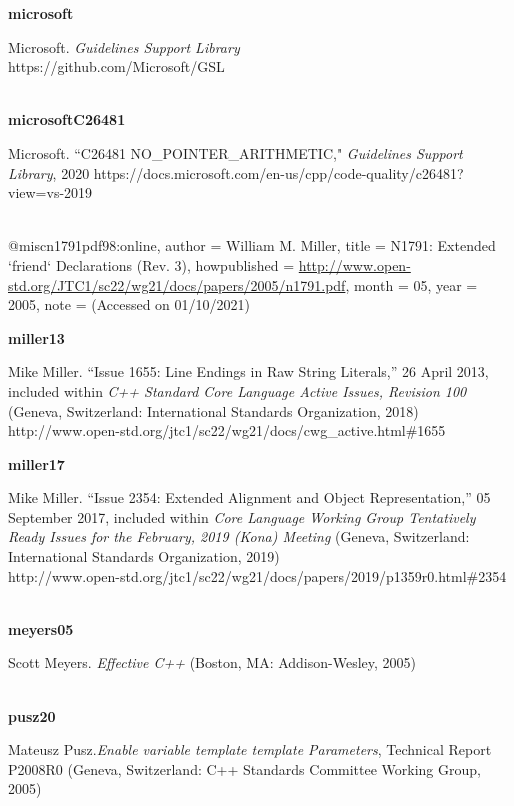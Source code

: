 \noindent\textbf{microsoft}\\
\hspace*{2em}\parbox[t]{\textwidth}{Microsoft. \textit{Guidelines Support Library}\\
https://github.com/Microsoft/GSL}\\

\noindent\textbf{microsoftC26481}\\
\hspace*{2em}\parbox[t]{\textwidth}{Microsoft. ``C26481 NO\_POINTER\_ARITHMETIC," \textit{Guidelines Support Library}, 2020
https://docs.microsoft.com/en-us/cpp/code-quality/c26481?view=vs-2019}\\



@misc{n1791pdf98:online,
author = {William M. Miller},
title = {N1791: Extended `friend` Declarations (Rev. 3)},
howpublished = {\url{http://www.open-std.org/JTC1/sc22/wg21/docs/papers/2005/n1791.pdf}},
month = {05},
year = {2005},
note = {(Accessed on 01/10/2021)}
}

\noindent\textbf{miller13}\\
\hspace*{2em}\parbox[t]{\textwidth}{Mike Miller. ``Issue 1655: Line Endings in Raw String Literals,” 26 April 2013, included within \textit{C++ Standard Core Language Active Issues, Revision 100} (Geneva, Switzerland: International Standards Organization, 2018)\\
http://www.open-std.org/jtc1/sc22/wg21/docs/cwg\_active.html\#1655}

\noindent\textbf{miller17}\\
\hspace*{2em}\parbox[t]{\textwidth}{Mike Miller. ``Issue 2354: Extended Alignment and Object Representation,” 05 September 2017, included within \textit{Core Language Working Group Tentatively Ready Issues for the February, 2019 (Kona) Meeting} (Geneva, Switzerland: International Standards Organization, 2019)\\
http://www.open-std.org/jtc1/sc22/wg21/docs/papers/2019/p1359r0.html\#2354}\\

\noindent\textbf{meyers05}\\
\hspace*{2em}\parbox[t]{\textwidth}{Scott Meyers. \textit{Effective C++} (Boston, MA: Addison-Wesley, 2005)}\\

\noindent\textbf{pusz20}\\
\hspace*{2em}\parbox[t]{\textwidth}{Mateusz Pusz.\textit{Enable variable template template Parameters}, Technical Report P2008R0 (Geneva, Switzerland: C++ Standards Committee Working Group, 2005)}\\

